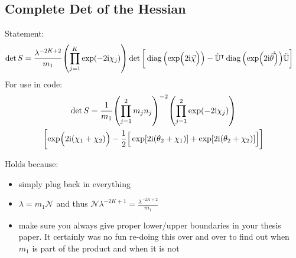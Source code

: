 \documentclass[
	english,
	a4paper,
	fontsize=10pt,
	parskip=half,
	titlepage=true,
	DIV=12,
	final
]{scrreprt}
\newcommand*{\transp}{\ensuremath{^\intercal}}
\newcommand*{\iunit}{\ensuremath{\mathrm{i}}}
\DeclareMathOperator{\diag}{diag}
\begin{document}
\subsection{Complete Det of the Hessian}
Statement:
\begin{align}
	\det S
&=
	\frac{ \lambda^{-2K+2} }{ m_1 }
	\qty( \prod_{j=1}^{K} \exp(-2\iunit \chi_j) )
	\det\qty[\bigg.
		\diag\qty(\exp(\Big.2\iunit\vec{\chi}))
		-
		\tilde{\mathbb{U}}\transp
		\diag\qty(\exp(2\iunit\vec{\theta}))
		\tilde{\mathbb{U}}
	]
\label{eqn:detComplete}
\end{align}
For use in code:
\begin{multline*}
	\det S
=
	\frac{1}{m_1}
	\qty( \prod_{j=1}^{2} m_j n_j)^{-2}
	\qty( \prod_{j=1}^{2} \exp(-2\iunit \chi_j) )
\\
	\qty[
		\exp( \Big. 2\iunit (\chi_1 + \chi_2) )
		-\frac{1}{2} \qty[ \Big.
			\exp[2\iunit (\theta_2 + \chi_1)] +
			\exp[2\iunit (\theta_2 + \chi_2)]
		]
	]
\end{multline*}

Holds because:
\begin{itemize}
\item simply plug back in everything
\item $\lambda = m_1 \mathcal{N}$ 
	and thus 
	$\mathcal{N} \lambda^{-2K+1} = \frac{ \lambda^{-2K+2} }{ m_1 }$
\item \color{red} make sure you always give proper lower/upper boundaries in your thesis paper. It certainly was no fun re-doing this over and over to find out when $m_1$ is part of the product and when it is not
\end{itemize}
\end{document}
